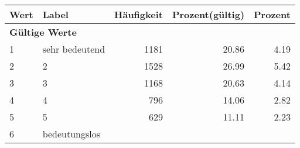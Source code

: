     \begin{longtable}{lXrrr}
     \toprule
     \textbf{Wert} & \textbf{Label} & \textbf{Häufigkeit} & \textbf{Prozent(gültig)} & \textbf{Prozent} \\
     \endhead
     \midrule
     \multicolumn{5}{l}{\textbf{Gültige Werte}}\\

     1 &
     \multicolumn{1}{X}{ sehr bedeutend   } &


       \num{1181} &
       \num[round-mode=places,round-precision=2]{20.86} &
         \num[round-mode=places,round-precision=2]{4.19} \\

     2 &
     \multicolumn{1}{X}{ 2   } &


       \num{1528} &
       \num[round-mode=places,round-precision=2]{26.99} &
         \num[round-mode=places,round-precision=2]{5.42} \\

     3 &
     \multicolumn{1}{X}{ 3   } &


       \num{1168} &
       \num[round-mode=places,round-precision=2]{20.63} &
         \num[round-mode=places,round-precision=2]{4.14} \\

     4 &
     \multicolumn{1}{X}{ 4   } &


       \num{796} &
       \num[round-mode=places,round-precision=2]{14.06} &
         \num[round-mode=places,round-precision=2]{2.82} \\

     5 &
     \multicolumn{1}{X}{ 5   } &


       \num{629} &
       \num[round-mode=places,round-precision=2]{11.11} &
         \num[round-mode=places,round-precision=2]{2.23} \\

     6 &
     \multicolumn{1}{X}{ bedeutungslos   } &



\end{longtable}
